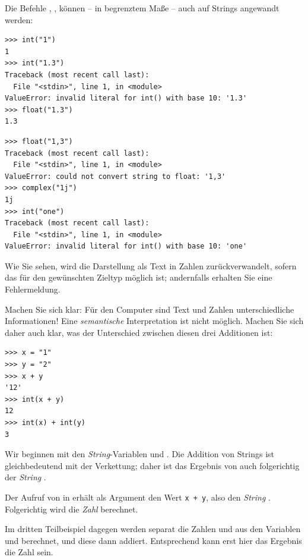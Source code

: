 Die Befehle , ,  können -- in begrenztem Maße -- auch auf Strings angewandt werden:

\begin{cmdbox}
\begin{verbatim}
>>> int("1")
1
>>> int("1.3")
Traceback (most recent call last):
  File "<stdin>", line 1, in <module>
ValueError: invalid literal for int() with base 10: '1.3'
>>> float("1.3")
1.3
\end{verbatim}
\end{cmdbox}
%
\begin{cmdbox}[]
\begin{verbatim}
>>> float("1,3")
Traceback (most recent call last):
  File "<stdin>", line 1, in <module>
ValueError: could not convert string to float: '1,3'
>>> complex("1j")
1j
>>> int("one")
Traceback (most recent call last):
  File "<stdin>", line 1, in <module>
ValueError: invalid literal for int() with base 10: 'one'
\end{verbatim}
\end{cmdbox}

Wie Sie sehen, wird die Darstellung als Text in Zahlen zurückverwandelt, sofern das für den gewünschten Zieltyp möglich ist; andernfalls erhalten Sie eine Fehlermeldung.

Machen Sie sich klar: Für den Computer sind Text und Zahlen unterschiedliche Informationen! Eine \emph{semantische} Interpretation ist nicht möglich. Machen Sie sich daher auch klar, was der Unterschied zwischen diesen drei Additionen ist:
\begin{cmdbox}
\begin{verbatim}
>>> x = "1"
>>> y = "2"
>>> x + y
'12'
>>> int(x + y)
12
>>> int(x) + int(y)
3
\end{verbatim}
\end{cmdbox}

Wir beginnen mit den \emph{String}-Variablen  und . Die Addition von Strings ist gleichbedeutend mit der Verkettung; daher ist das Ergebnis von  auch folgerichtig der \emph{String} .

Der Aufruf von  in  erhält als Argument den Wert \texttt{x + y}, also den \emph{String} . Folgerichtig wird die \emph{Zahl}  berechnet.

Im dritten Teilbeispiel  dagegen werden separat die Zahlen  und  aus den Variablen  und  berechnet, und diese dann addiert. Entsprechend kann erst hier das Ergebnis die Zahl  sein.

